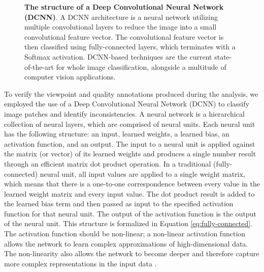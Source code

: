 


\begin{figure}[t]%
	\centering
    	\caption[The Structure of a Deep Convolutional Neural Network (DCNN)]{\textbf{The structure of a Deep Convolutional Neural Network (DCNN)}.  A DCNN architecture is a neural network utilizing multiple convolutional layers to reduce the image into a small convolutional feature vector.  The convolutional feature vector is then classified using fully-connected layers, which terminates with a Softmax activation.  DCNN-based techniques are the current state-of-the-art for whole image classification, alongside a multitude of computer vision applications.}
    	\label{fig:dcnn}
\end{figure}

To verify the viewpoint and quality annotations produced during the analysis, we employed the use of a Deep Convolutional Neural Network (DCNN) to classify image patches and identify inconsistencies.  A neural network is a hierarchical collection of neural layers, which are comprised of neural units.  Each neural unit has the following structure: an input, learned weights, a learned bias, an activation function, and an output.  The input to a neural unit is applied against the matrix (or vector) of its learned weights and produces a single number result through an efficient matrix dot product operation.  In a traditional (fully-connected) neural unit, all input values are applied to a single weight matrix, which means that there is a one-to-one correspondence between every value in the learned weight matrix and every input value.  The dot product result is added to the learned bias term and then passed as input to the specified activation function for that neural unit.  The output of the activation function is the output of the neural unit.  This structure is formalized in Equation \ref{eq:fully-connected}.  The activation function should be non-linear; a non-linear activation function allows the network to learn complex approximations of high-dimensional data.  The non-linearity also allows the network to  become deeper and therefore capture more complex representations in the input data \cite{hecht-nielsen_theory_1989, krizhevsky_imagenet_2012, glorot_deep_2011}.

